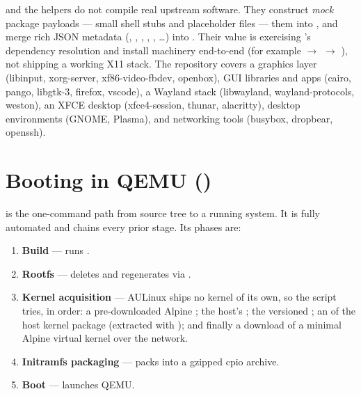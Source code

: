 \begin{notebox}
 and the  helpers do not
compile real upstream software. They construct \emph{mock} package payloads
--- small shell stubs and placeholder  files ---  them
into , and merge rich JSON metadata
(, , , ,
, \ldots) into . Their value is exercising
's dependency resolution and install machinery end-to-end (for
example  $\rightarrow$  $\rightarrow$
), not shipping a working X11 stack. The repository covers a
graphics layer (libinput, xorg-server, xf86-video-fbdev, openbox), GUI
libraries and apps (cairo, pango, libgtk-3, firefox, vscode), a Wayland stack
(libwayland, wayland-protocols, weston), an XFCE desktop (xfce4-session,
thunar, alacritty), desktop environments (GNOME, Plasma), and networking tools
(busybox, dropbear, openssh).
\end{notebox}

\section{Booting in QEMU ()}

 is the one-command path from source tree to a running
system. It is fully automated and chains every prior stage. Its phases are:

\begin{enumerate}
  \item \textbf{Build} --- runs .
  \item \textbf{Rootfs} --- deletes and regenerates  via
        .
  \item \textbf{Kernel acquisition} --- AULinux ships no kernel of its own, so
        the script tries, in order: a pre-downloaded Alpine
        ; the host's ; the versioned
        ; an  of the
        host kernel package (extracted with ); and finally a
        download of a minimal Alpine virtual kernel over the network.
  \item \textbf{Initramfs packaging} --- packs  into a gzipped
        cpio archive.
  \item \textbf{Boot} --- launches QEMU.
\end{enumerate}

